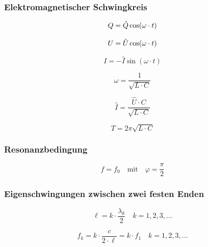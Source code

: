 \subsubsection{Elektromagnetischer Schwingkreis}
\begin{equation}\label{eq:elektromagnetischer:schwingkreis:ladung}
Q = \hat{Q}\cos(\omega \cdot t)\\
\end{equation}

\begin{equation}\label{eq:elektromagnetischer:schwingkreis:spannung}
U = \hat{U}\cos(\omega \cdot t)\\
\end{equation}

\begin{equation}\label{eq:elektromagnetischer:schwingkreis:stromstaerke}
I = - \hat{I}\sin(\omega \cdot t)
\end{equation}

\begin{equation}\label{eq:elektromagnetischer:schwingkreis:winkelgeschwindigkeit}
\omega = \frac{1}{\sqrt{L \cdot C}}
\end{equation}

\begin{equation}\label{eq:elektromagnetischer:schwingkreis:maximale:stromstaerke}
\hat{I} = \frac{\hat{U} \cdot C}{\sqrt{L \cdot C}}
\end{equation}

\begin{equation}\label{eq:elektromagnetischer:schwingkreis:periodendauer}
T = 2\pi \sqrt{L \cdot C}
\end{equation}

\subsubsection{Resonanzbedingung}
\begin{equation}\label{eq:resonanzbedingung}
f = f_0 \quad\text{mit}\quad \varphi = \frac{\pi}{2}
\end{equation}

\subsubsection{Eigenschwingungen zwischen zwei festen Enden}
\begin{equation}\label{eq:eigenschwingung:laengen}
\ell = k \cdot \frac{\lambda_k}{2} \quad k = 1, 2, 3,\ldots
\end{equation}

\begin{equation}\label{eq:eigenschwingung:frequenzen}
f_k = k \cdot \frac{c}{2 \cdot \ell} = k \cdot f_1 \quad k = 1, 2, 3,\ldots
\end{equation}